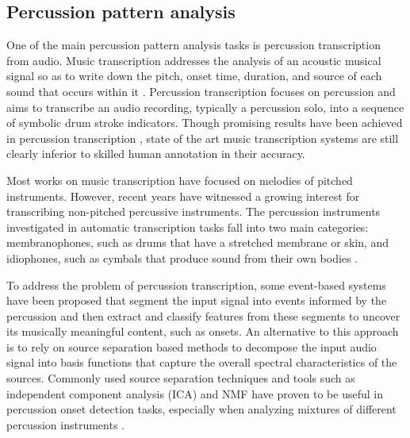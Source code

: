 \subsection{Percussion pattern analysis}\label{sec:bkgnd:sotapercpatt}
One of the main percussion pattern analysis tasks is percussion transcription from audio. Music transcription addresses the analysis of an acoustic musical signal so as to write down the pitch, onset time, duration, and source of each sound that occurs within it \cite{klapuri:06:transcription}. Percussion transcription focuses on percussion and aims to transcribe an audio recording, typically a percussion solo, into a sequence of symbolic drum stroke indicators. Though promising results have been achieved in percussion transcription \cite{gillet:04:drumloops,paulus:05:drum,paulus:06:percTranscription}, state of the art music transcription systems are still clearly inferior to skilled human annotation in their accuracy. 

Most works on music transcription have focused on melodies of pitched instruments. However, recent years have witnessed a growing interest for transcribing non-pitched percussive instruments. The percussion instruments investigated in automatic transcription tasks fall into two main categories: membranophones, such as drums that have a stretched membrane or skin, and idiophones, such as cymbals that produce sound from their own bodies \cite{fletcher:98:physics}. 

To address the problem of percussion transcription, some event-based systems \cite{gillet:04:drumloops,gouyon:02:pulse,goto:94:soundSep,gillet:08:transcription} have been proposed that segment the input signal into events informed by the percussion and then extract and classify features from these segments to uncover its musically meaningful content, such as onsets. An alternative to this approach is to rely on source separation based methods to decompose the input audio signal into basis functions that capture the overall spectral characteristics of the sources. Commonly used source separation techniques and tools such as independent component analysis (ICA) and \gls{NMF} have proven to be useful in percussion onset detection tasks, especially when analyzing mixtures of different percussion instruments \cite{paulus:05:drum,smaragdis:04:convNMF,smaragdis:04:techreportNMF, abdallah:03:probability}. 

